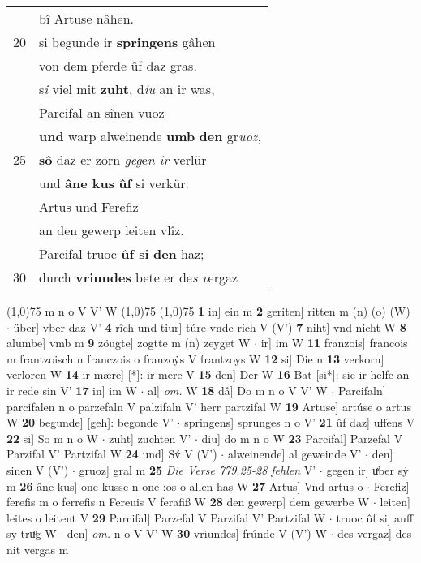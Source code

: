 \documentclass[8pt,a4paper,notitlepage]{article}
\begin{document}
\begin{table}[ht]
\begin{minipage}[t]{0.5\linewidth}
\begin{tabular}{rl}
 & bî Artuse nâhen.\\ 
20 & si begunde ir \textbf{springens} gâhen\\ 
 & von dem pferde ûf daz gras.\\ 
 & s\textit{i} viel mit \textbf{zuht}, d\textit{iu} an ir was,\\ 
 & Parcifal an sînen vuoz\\ 
 & \textbf{und} warp alweinende \textbf{umb} \textbf{den} gr\textit{uoz},\\ 
25 & \textbf{sô} daz er zorn \textit{geg}e\textit{n ir} verlür\\ 
 & und \textbf{âne kus} \textbf{ûf} si verkür.\\ 
 & Artus und Ferefiz\\ 
 & an den gewerp leiten vlîz.\\ 
 & Parcifal truoc \textbf{ûf si} \textbf{den} haz;\\ 
30 & durch \textbf{vriundes} bete er de\textit{s v}ergaz\\ 
\end{tabular}
\scriptsize
\line(1,0){75} \newline
m n o V V' W \newline
\line(1,0){75} \newline
\newline
\line(1,0){75} \newline
\textbf{1} in] ein m \textbf{2} geriten] ritten m (n) (o) (W)  $\cdot$ über] vber daz V' \textbf{4} rîch und tiur] túre vnde rich V (V') \textbf{7} niht] vnd nicht W \textbf{8} alumbe] vmb m \textbf{9} zöugte] zogtte m (n) zeyget W  $\cdot$ ir] im W \textbf{11} franzois] francois m frantzoisch n franczois o franzoẏs V frantzoys W \textbf{12} si] Die n \textbf{13} verkorn] verloren W \textbf{14} ir mære] [*]: ir mere V \textbf{15} den] Der W \textbf{16} Bat [si*]: sie ir helfe an ir rede sin V' \textbf{17} in] im W  $\cdot$ al] \textit{om.} W \textbf{18} dâ] Do m n o V V' W  $\cdot$ Parcifaln] parcifalen n o parzefaln V palzifaln V' herr partzifal W \textbf{19} Artuse] artúse o artus W \textbf{20} begunde] [geh]: begonde V'  $\cdot$ springens] sprunges n o V' \textbf{21} ûf daz] uffens V \textbf{22} si] So m n o W  $\cdot$ zuht] zuchten V'  $\cdot$ diu] do m n o W \textbf{23} Parcifal] Parzefal V Parzifal V' Partzifal W \textbf{24} und] Sv́ V (V')  $\cdot$ alweinende] al geweinde V'  $\cdot$ den] sinen V (V')  $\cdot$ gruoz] gral m \textbf{25} \textit{Die Verse 779.25-28 fehlen} V'   $\cdot$ gegen ir] uͯber sẏ m \textbf{26} âne kus] one kusse n one :os o allen has W \textbf{27} Artus] Vnd artus o  $\cdot$ Ferefiz] ferefis m o ferrefis n Fereuis V ferafiß W \textbf{28} den gewerp] dem gewerbe W  $\cdot$ leiten] leites o leitent V \textbf{29} Parcifal] Parzefal V Parzifal V' Partzifal W  $\cdot$ truoc ûf si] auff sy truͦg W  $\cdot$ den] \textit{om.} n o V V' W \textbf{30} vriundes] frúnde V (V') W  $\cdot$ des vergaz] des nit vergas m \newline
\end{minipage}
\end{table}
\end{document}
